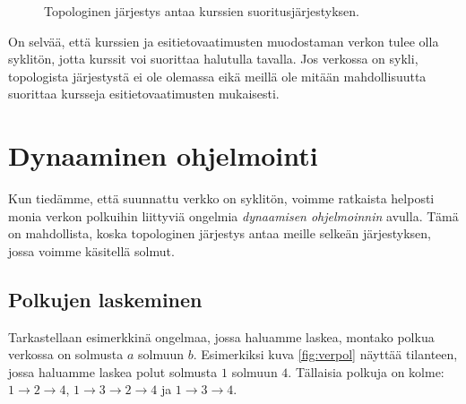 \begin{figure}
\center
\begin{center}
\end{center}
\caption{Topologinen järjestys antaa kurssien suoritusjärjestyksen.}
\label{fig:kurjar}
\end{figure}

On selvää, että kurssien ja esitietovaatimusten muodostaman
verkon tulee olla syklitön, jotta kurssit voi suorittaa halutulla tavalla.
Jos verkossa on sykli, topologista järjestystä ei ole olemassa
eikä meillä ole mitään mahdollisuutta suorittaa kursseja
esitietovaatimusten mukaisesti.

\section{Dynaaminen ohjelmointi}

Kun tiedämme, että suunnattu verkko on syklitön,
voimme ratkaista helposti monia verkon polkuihin
liittyviä ongelmia \emph{dynaamisen ohjelmoinnin} avulla.
Tämä on mahdollista, koska topologinen järjestys antaa
meille selkeän järjestyksen, jossa voimme käsitellä solmut.

\subsection{Polkujen laskeminen}

Tarkastellaan esimerkkinä ongelmaa, jossa haluamme laskea,
montako polkua verkossa on solmusta $a$ solmuun $b$.
Esimerkiksi kuva \ref{fig:verpol} näyttää tilanteen,
jossa haluamme laskea polut solmusta $1$ solmuun $4$.
Tällaisia polkuja on kolme:
$1 \rightarrow 2 \rightarrow 4$,
$1 \rightarrow 3 \rightarrow 2 \rightarrow 4$ ja
$1 \rightarrow 3 \rightarrow 4$.

